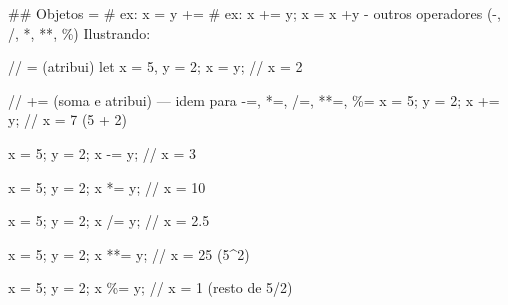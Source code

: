 \documentclass[
  portuguese,
  letterpaper,
  DIV=11,
  numbers=noendperiod]{scrreprt}
\newenvironment{Shaded}{\begin{snugshade}}{\end{snugshade}}
\newcommand{\CommentTok}[1]{\textcolor[rgb]{0.37,0.37,0.37}{#1}}
\newcommand{\DecValTok}[1]{\textcolor[rgb]{0.68,0.00,0.00}{#1}}
\newcommand{\FunctionTok}[1]{\textcolor[rgb]{0.28,0.35,0.67}{#1}}
\newcommand{\NormalTok}[1]{\textcolor[rgb]{0.00,0.23,0.31}{#1}}
\newcommand{\OperatorTok}[1]{\textcolor[rgb]{0.37,0.37,0.37}{#1}}
\newcommand{\SpecialCharTok}[1]{\textcolor[rgb]{0.37,0.37,0.37}{#1}}
\newcommand{\SpecialStringTok}[1]{\textcolor[rgb]{0.13,0.47,0.30}{#1}}
\begin{document}
\begin{Shaded}
\begin{Highlighting}[]
\NormalTok{\#\# Objetos}
\OperatorTok{=}\NormalTok{  \# ex}\OperatorTok{:}\NormalTok{ x }\OperatorTok{=}\NormalTok{ y}
\OperatorTok{+=}\NormalTok{ \# ex}\OperatorTok{:}\NormalTok{ x }\OperatorTok{+=}\NormalTok{ y}\OperatorTok{;}\NormalTok{ x }\OperatorTok{=}\NormalTok{ x }\OperatorTok{+}\NormalTok{y }\OperatorTok{{-}}\NormalTok{ outros }\FunctionTok{operadores}\NormalTok{ (}\OperatorTok{{-},} \SpecialStringTok{/, }\SpecialCharTok{*}\SpecialStringTok{, }\SpecialCharTok{**}\SpecialStringTok{, \%}\SpecialCharTok{)}
\SpecialStringTok{  }
\SpecialStringTok{  Ilustrando:}

\SpecialStringTok{// =  }\SpecialCharTok{(}\SpecialStringTok{atribui}\SpecialCharTok{)}
\SpecialStringTok{let x = 5, y = 2;}
\SpecialStringTok{x = y;           // x = 2}

\SpecialStringTok{// }\SpecialCharTok{+}\SpecialStringTok{=  }\SpecialCharTok{(}\SpecialStringTok{soma e atribui}\SpecialCharTok{)}\SpecialStringTok{ — idem para {-}=, }\SpecialCharTok{*}\SpecialStringTok{=, /}\OperatorTok{=,} \OperatorTok{**=,} \OperatorTok{\%=}
\NormalTok{x }\OperatorTok{=} \DecValTok{5}\OperatorTok{;}\NormalTok{ y }\OperatorTok{=} \DecValTok{2}\OperatorTok{;}
\NormalTok{x }\OperatorTok{+=}\NormalTok{ y}\OperatorTok{;}          \CommentTok{// x = 7   (5 + 2)}

\NormalTok{x }\OperatorTok{=} \DecValTok{5}\OperatorTok{;}\NormalTok{ y }\OperatorTok{=} \DecValTok{2}\OperatorTok{;}
\NormalTok{x }\OperatorTok{{-}=}\NormalTok{ y}\OperatorTok{;}          \CommentTok{// x = 3}

\NormalTok{x }\OperatorTok{=} \DecValTok{5}\OperatorTok{;}\NormalTok{ y }\OperatorTok{=} \DecValTok{2}\OperatorTok{;}
\NormalTok{x }\OperatorTok{*=}\NormalTok{ y}\OperatorTok{;}          \CommentTok{// x = 10}

\NormalTok{x }\OperatorTok{=} \DecValTok{5}\OperatorTok{;}\NormalTok{ y }\OperatorTok{=} \DecValTok{2}\OperatorTok{;}
\NormalTok{x }\OperatorTok{/=}\NormalTok{ y}\OperatorTok{;}          \CommentTok{// x = 2.5}

\NormalTok{x }\OperatorTok{=} \DecValTok{5}\OperatorTok{;}\NormalTok{ y }\OperatorTok{=} \DecValTok{2}\OperatorTok{;}
\NormalTok{x }\OperatorTok{**=}\NormalTok{ y}\OperatorTok{;}         \CommentTok{// x = 25  (5\^{}2)}

\NormalTok{x }\OperatorTok{=} \DecValTok{5}\OperatorTok{;}\NormalTok{ y }\OperatorTok{=} \DecValTok{2}\OperatorTok{;}
\NormalTok{x }\OperatorTok{\%=}\NormalTok{ y}\OperatorTok{;}          \CommentTok{// x = 1   (resto de 5/2)}
\end{Highlighting}
\end{Shaded}
\end{document}

